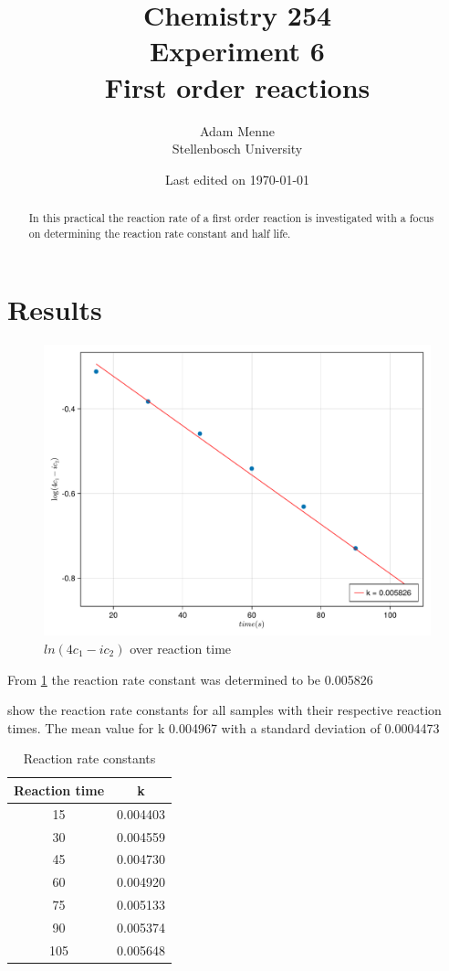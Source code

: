 \documentclass[a4paper, british]{article}
\title{Chemistry 254\\ Experiment 6\\ First order reactions}
\date{Last edited on \today}
\author{Adam Menne\\ Stellenbosch University}
\begin{document}
\maketitle

\begin{abstract}
\noindent
In this practical the reaction rate of a first order reaction is investigated with a focus on determining the reaction rate constant and half life.
\end{abstract}

\tableofcontents

\newpage


\section{Results}

\begin{figure}[H]
    \centering
    \includegraphics[width=\textwidth]{figures/f1.pdf}
    \caption{\(ln(4c_1 - ic_2)\) over reaction time}
    \label{fig:f1}
\end{figure}

From \cref{fig:f1} the reaction rate constant was determined to be 0.005826

 show the reaction rate constants for all samples with their respective reaction times. The mean value for k 0.004967 with a standard deviation of 0.0004473

\begin{table}[H]
    \centering
    \caption{Reaction rate constants}
    \vspace*{2mm}
    \label{tab:k}
    \begin{tabular}{cc}
    \toprule
    Reaction time & k \\ \midrule
    15 & 0.004403 \\
    30 & 0.004559 \\
    45 & 0.004730 \\
    60 & 0.004920 \\
    75 & 0.005133 \\
    90 & 0.005374 \\
    105 & 0.005648\\
    \bottomrule
    \end{tabular}
\end{table}
\end{document}
